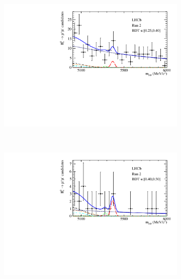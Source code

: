 \begin{figure}[htbp]
    \begin{subfigure}[b]{0.48\textwidth}
        \includegraphics[width=\textwidth]{./Figs/BFAnalysis/Bsmumu_Fit_Run2_bin2.pdf}
    \end{subfigure}
    ~ %
    \begin{subfigure}[b]{0.48\textwidth}
       \includegraphics[width=\textwidth]{./Figs/BFAnalysis/Bsmumu_Fit_Run2_bin3.pdf}
    \end{subfigure}
    \begin{subfigure}[b]{0.48\textwidth}

\end{subfigure}
\end{figure}
